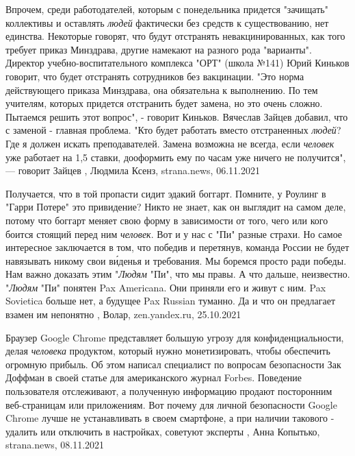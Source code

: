 Впрочем, среди работодателей, которым с понедельника придется "зачищать"
коллективы и оставлять \emph{людей} фактически без средств к существованию, нет
единства. Некоторые говорят, что будут отстранять невакцинированных, как того
требует приказ Минздрава, другие намекают на разного рода "варианты".  Директор
учебно-воспитательного комплекса "ОРТ" (школа №141) Юрий Киньков говорит, что
будет отстранять сотрудников без вакцинации. "Это норма действующего приказа
Минздрава, она обязательна к выполнению. По тем учителям, которых придется
отстранить будет замена, но это очень сложно. Пытаемся решить этот вопрос", -
говорит Киньков.  Вячеслав Зайцев добавил, что с заменой - главная проблема.
"Кто будет работать вместо отстраненных \emph{людей}? Где я должен искать
преподавателей. Замена возможна не всегда, если \emph{человек} уже работает на 1,5
ставки, дооформить ему по часам уже ничего не получится", — говорит Зайцев
, 
Людмила Ксенз, strana.news, 06.11.2021

Получается, что в той пропасти сидит эдакий боггарт. Помните, у Роулинг в
"Гарри Потере" это привидение? Никто не знает, как он выглядит на самом деле,
потому что боггарт меняет свою форму в зависимости от того, чего или кого
боится стоящий перед ним \emph{человек}.  Вот и у нас с "Пи" разные страхи.  Но самое
интересное заключается в том, что победив и перетянув, команда России не будет
навязывать никому свои ви́денья и требования. Мы боремся просто ради победы. Нам
важно доказать этим "\emph{Людям} "Пи", что мы правы. А что дальше, неизвестно.
"\emph{Людям} "Пи" понятен Pax Americana. Они приняли его и живут с ним. Pax Sovietica
больше нет, а будущее Pax Russian туманно. Да и что он предлагает взамен им
непонятно
, Волар, zen.yandex.ru, 25.10.2021

Браузер Google Chrome представляет большую угрозу для конфиденциальности, делая
\emph{человека} продуктом, который нужно монетизировать, чтобы обеспечить огромную
прибыль.  Об этом написал специалист по вопросам безопасности Зак Доффман в
своей статье для американского журнал Forbes.  Поведение пользователя
отслеживают, а полученную информацию продают посторонним веб-страницам или
приложениям. Вот почему для личной безопасности Google Chrome лучше не
устанавливать в своем смартфоне, а при наличии такового - удалить или отключить
в настройках, советуют эксперты
, 
Анна Копытько, strana.news, 08.11.2021

